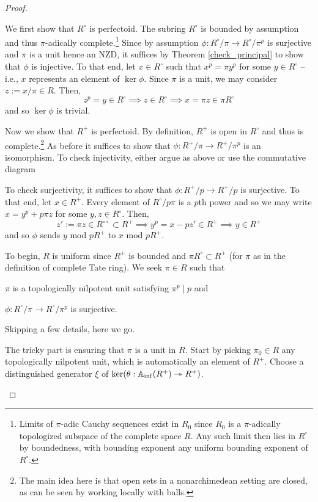 \documentclass[11pt]{article}
\begin{document}
\begin{proof}
\hfill
\begin{enum}{\alph}
\item We first show that $R^{\circ}$ is perfectoid. The subring $R^{\circ}$ is bounded by assumption and thus $\pi$-adically complete.\footnote{Limits of $\pi$-adic Cauchy sequences exist in $R_0$ since $R_0$ is a $\pi$-adically topologized subspace of the complete space $R$. Any such limit then lies in $R^{\circ}$ by boundedness, with bounding exponent any uniform bounding exponent of $R^{\circ}$.} Since by assumption $\phi: R^{\circ}/\pi\to R^{\circ}/\pi^p$ is surjective and $\pi$ is a unit hence an NZD, it suffices by Theorem \ref{check_principal} to show that $\phi$ is injective. To that end, let $x\in R^{\circ}$ such that $x^p=\pi y^p$ for some $y\in R^{\circ}$ -- i.e., $x$ represents an element of $\ker\phi$. Since $\pi$ is a unit, we may consider $z:=x/\pi\in R$. Then,
$$z^p=y\in R^{\circ}\implies z\in R^{\circ}\implies x=\pi z\in\pi R^{\circ}$$
and so $\ker\phi$ is trivial. 

Now we show that $R^+$ is perfectoid. By definition, $R^+$ is open in $R^{\circ}$ and thus is complete.\footnote{The main idea here is that open sets in a nonarchimedean setting are closed, as can be seen by working locally with balls.} As before it suffices to show that $\phi: R^+/\pi\to R^+/\pi^p$ is an isomorphism. To check injectivity, either argue as above or use the commutative diagram
\begin{center}
\end{center}
To check surjectivity, it suffices to show that $\phi: R^+/p\to R^+/p$ is surjective. To that end, let $x\in R^+$. Every element of $R^{\circ}/p\pi$ is a $p$th power and so we may write $x=y^p+p\pi z$ for some $y,z\in R^{\circ}$. Then,
$$z':=\pi z\in R^{\circ\circ}\subset R^+\implies y^p=x-pz'\in R^+\implies y\in R^+$$
and so $\phi$ sends $y$ mod $pR^+$ to $x$ mod $pR^+$.

\item To begin, $R$ is uniform since $R^+$ is bounded and $\pi R^{\circ}\subset R^+$ (for $\pi$ as in the definition of complete Tate ring). We seek $\pi\in R$ such that 
\begin{enum}{\arabic}
\item $\pi$ is a topologically nilpotent unit satisfying $\pi^p\mid p$ and 
\item $\phi: R^{\circ}/\pi\to R^{\circ}/\pi^p$ is surjective.
\end{enum}
Skipping a few details, here we go.
\begin{enum}{\arabic}
\item The tricky part is ensuring that $\pi$ is a unit in $R$. Start by picking $\pi_0\in R$ any topologically nilpotent unit, which is automatically an element of $R^+$. Choose a distinguished generator $\xi$ of $\ker(\theta: \mathbb{A}_{\inf}(R^+)\twoheadrightarrow R^+)$. 


\end{enum}
\end{enum}
\end{proof}
\end{document}
